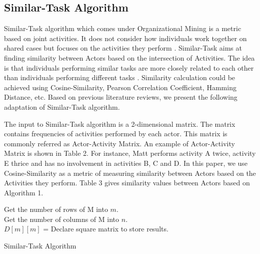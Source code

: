 \documentclass[11pt]{article}
\begin{document}
\subsection{Similar-Task Algorithm}
\par{Similar-Task algorithm which comes under Organizational Mining is a metric based on joint activities. It does not consider how individuals work together on shared cases but focuses on the activities they perform \cite{aalst}. Similar-Task aims at finding similarity between Actors based on the intersection of Activities. The idea is that individuals performing similar tasks are more closely related to each other than individuals performing different tasks  \cite{aalst}. Similarity calculation could be achieved using Cosine-Similarity, Pearson Correlation Coefficient, Hamming Distance, etc. Based on previous literature reviews, we present the following adaptation of Similar-Task algorithm.}
\par{The input to Similar-Task algorithm is a 2-dimensional matrix. The matrix contains frequencies of activities performed by each actor. This matrix is commonly referred as Actor-Activity Matrix. An example of Actor-Activity Matrix is shown in Table 2. For instance, Matt performs activity A twice, activity E thrice and has no involvement in activities B, C and D. In this paper, we use Cosine-Similarity as a metric of measuring similarity between Actors based on the Activities they perform. Table 3 gives similarity values between Actors based on Algorithm 1.}
\begin{algorithm}[t]
Get the number of rows of M into \textbf{$m$}.\\
Get the number of columns of M into \textbf{$n$}.\\
$D[m][m]$ = Declare square matrix to store results.\\
\caption{Similar-Task Algorithm}
\label{alg:Similar-Task Algorithm}
\end{algorithm}
\end{document}
